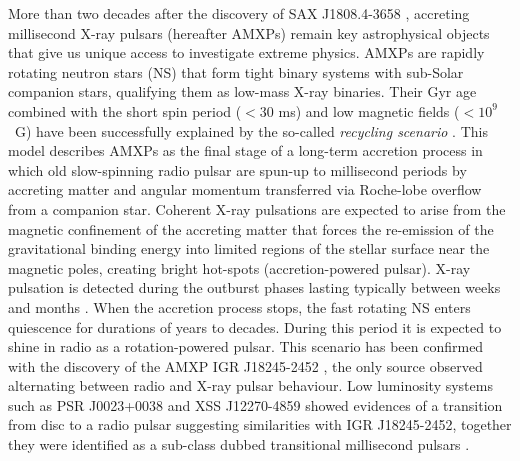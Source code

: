 \documentclass[fleqn,usenatbib]{mnras}
\begin{document}
More than two decades after the discovery of SAX J1808.4-3658 \citep{Wijnands:1998vk}, accreting millisecond X-ray pulsars (hereafter AMXPs) remain key astrophysical objects that give us unique access to investigate extreme physics. AMXPs are rapidly rotating neutron stars (NS) that form tight binary systems with sub-Solar companion stars, qualifying them as low-mass X-ray binaries. Their Gyr age combined with the short spin period ($<30$ ms) and low magnetic fields ($<10^9$~G) have been successfully explained by the so-called \textit{recycling scenario} \citep[see e.g.,][]{Alpar:1982wh,Bhattacharya91}. This model describes AMXPs as the final stage of a long-term accretion process in which old slow-spinning radio pulsar are spun-up to millisecond periods by accreting matter and angular momentum transferred via Roche-lobe overflow from a companion star. Coherent X-ray pulsations are expected to arise from the magnetic confinement of the accreting matter that forces the re-emission of the gravitational binding energy into limited regions of the stellar surface near the magnetic poles, creating bright hot-spots (accretion-powered pulsar).  
X-ray pulsation is detected during the outburst phases lasting typically between weeks and months \citep[see e.g.,][for a review]{Di-Salvo:2020va,Patruno:2021vs}.
When the accretion process stops, the fast rotating NS enters quiescence for durations of years to decades. During this period it is expected to shine in radio as a rotation-powered pulsar. This scenario has been confirmed with the discovery of the AMXP IGR J18245-2452 \citep{Papitto:2013uf}, the only source observed alternating between radio and X-ray pulsar behaviour. Low luminosity systems such as PSR J0023+0038 \citep[see e.g.,][]{Stappers:2014wn,Archibald:2015vw} and XSS J12270-4859 \citep[see e.g.,][]{Bassa:2014uu,Papitto:2015wo} showed evidences of a transition from disc to a radio pulsar suggesting similarities with IGR J18245-2452, together they were identified as a sub-class dubbed transitional millisecond pulsars \citep[see][for a review]{Papitto:2020wl}.
\end{document}
